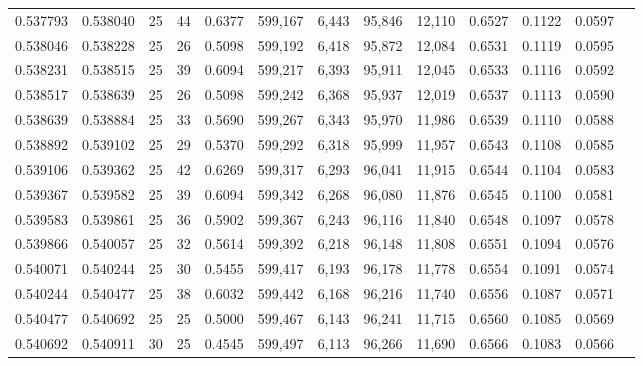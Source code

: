 \begin{tabular}{rrrrrrrrrrrrr}
0.537793 & 0.538040 &    25 &  44 &                                     0.6377 & 599,167 &   6,443 &  95,846 &  12,110 & 0.6527 & 0.1122 & 0.0597 \\
0.538046 & 0.538228 &    25 &  26 &                                     0.5098 & 599,192 &   6,418 &  95,872 &  12,084 & 0.6531 & 0.1119 & 0.0595 \\
0.538231 & 0.538515 &    25 &  39 &                                     0.6094 & 599,217 &   6,393 &  95,911 &  12,045 & 0.6533 & 0.1116 & 0.0592 \\
0.538517 & 0.538639 &    25 &  26 &                                     0.5098 & 599,242 &   6,368 &  95,937 &  12,019 & 0.6537 & 0.1113 & 0.0590 \\
0.538639 & 0.538884 &    25 &  33 &                                     0.5690 & 599,267 &   6,343 &  95,970 &  11,986 & 0.6539 & 0.1110 & 0.0588 \\
0.538892 & 0.539102 &    25 &  29 &                                     0.5370 & 599,292 &   6,318 &  95,999 &  11,957 & 0.6543 & 0.1108 & 0.0585 \\
0.539106 & 0.539362 &    25 &  42 &                                     0.6269 & 599,317 &   6,293 &  96,041 &  11,915 & 0.6544 & 0.1104 & 0.0583 \\
0.539367 & 0.539582 &    25 &  39 &                                     0.6094 & 599,342 &   6,268 &  96,080 &  11,876 & 0.6545 & 0.1100 & 0.0581 \\
0.539583 & 0.539861 &    25 &  36 &                                     0.5902 & 599,367 &   6,243 &  96,116 &  11,840 & 0.6548 & 0.1097 & 0.0578 \\
0.539866 & 0.540057 &    25 &  32 &                                     0.5614 & 599,392 &   6,218 &  96,148 &  11,808 & 0.6551 & 0.1094 & 0.0576 \\
0.540071 & 0.540244 &    25 &  30 &                                     0.5455 & 599,417 &   6,193 &  96,178 &  11,778 & 0.6554 & 0.1091 & 0.0574 \\
0.540244 & 0.540477 &    25 &  38 &                                     0.6032 & 599,442 &   6,168 &  96,216 &  11,740 & 0.6556 & 0.1087 & 0.0571 \\
0.540477 & 0.540692 &    25 &  25 &                                     0.5000 & 599,467 &   6,143 &  96,241 &  11,715 & 0.6560 & 0.1085 & 0.0569 \\
0.540692 & 0.540911 &    30 &  25 &                                     0.4545 & 599,497 &   6,113 &  96,266 &  11,690 & 0.6566 & 0.1083 & 0.0566 \\

\end{tabular}
